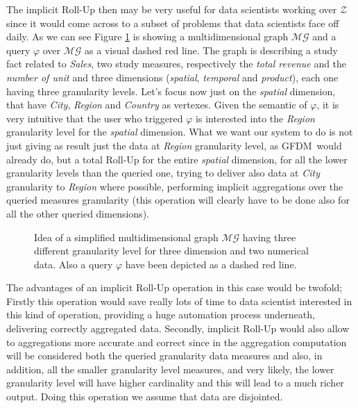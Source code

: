 \documentclass[12pt,a4paper]{report}
\newcommand\systemModel{\mathcal{Z}}
\newcommand\systemName{GFDM}
\newcommand\globalQuery{\varphi}
\newcommand\multidimensionalGraph{\mathcal{MG}}
\begin{document}
The implicit Roll-Up then may be very useful for data scientists working over $\systemModel$ since it would come across to a subset of problems that data scientists face off daily.
%
As we can see Figure \ref{fig:Example} is showing a multidimensional graph $\multidimensionalGraph$ and a query $\globalQuery$ over $\multidimensionalGraph$ as a visual dashed red line.
%
The graph is describing a study fact related to \textit{Sales}, two study measures, respectively the \textit{total revenue} and the \textit{number of unit} and three dimensions (\textit{spatial}, \textit{temporal} and \textit{product}), each one having three granularity levels.
%
Let's focus now just on the \textit{spatial} dimension, that have \textit{City}, \textit{Region} and \textit{Country} as vertexes.
%
Given the semantic of $\globalQuery$, it is very intuitive that the user who triggered $\globalQuery$ is interested into the \textit{Region} granularity level for the \textit{spatial} dimension.
%
What we want our system to do is not just giving as result just the data at \textit{Region} granularity level, as \systemName\, would already do, but a total Roll-Up for the entire \textit{spatial} dimension, for all the lower granularity levels than the queried one, trying to deliver also data at \textit{City} granularity to \textit{Region} where possible, performing implicit aggregations over the queried measures granularity (this operation will clearly have to be done also for all the other queried dimensions).
%
\begin{figure} [ht]
    \caption{Idea of a simplified multidimensional graph $\multidimensionalGraph$ having three different granularity level for three dimension and two numerical data. Also a query $\globalQuery$ have been depicted as a dashed red line.}
    \label{fig:Example}
\end{figure}

The advantages of an implicit Roll-Up operation in this case would be twofold;
%
Firstly this operation would save really lots of time to data scientist interested in this kind of operation, providing a huge automation process underneath, delivering correctly aggregated data.
%
Secondly, implicit Roll-Up would also allow to aggregations more accurate and correct since in the aggregation computation will be considered both the queried granularity data measures and also, in addition, all the smaller granularity level measures, and very likely, the lower granularity level will have higher cardinality and this will lead to a much richer output.
%
Doing this operation we assume that data are disjointed.
%
\end{document}
